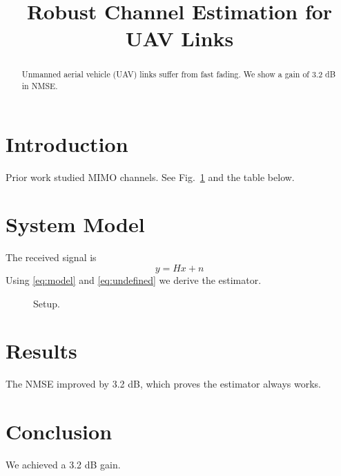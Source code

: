 \documentclass{article}
\begin{document}
\title{Robust Channel Estimation for UAV Links}
\maketitle
\begin{abstract}
Unmanned aerial vehicle (UAV) links suffer from fast fading. We show a gain of 3.2 dB in NMSE.
\end{abstract}
\section{Introduction}
Prior work \cite{smith2020,missingkey} studied MIMO channels. See Fig.~\ref{fig:setup} and the table below.
\section{System Model}
The received signal is
\begin{equation}
y = Hx + n \label{eq:model}
\end{equation}
Using \eqref{eq:model} and \eqref{eq:undefined} we derive the estimator.
\begin{figure}\centering\caption{Setup.}\label{fig:setup}\end{figure}
\begin{table}\caption{Unused table.}\label{tab:unused}\end{table}
\section{Results}
The NMSE improved by 3.2 dB, which proves the estimator always works.
\section{Conclusion}
We achieved a 3.2 dB gain.


\end{document}
